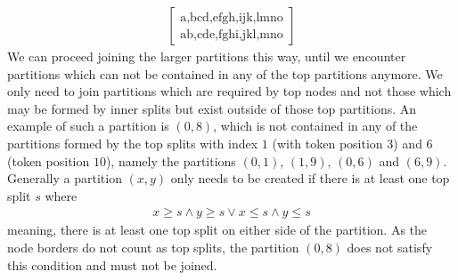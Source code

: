 {
\ttfamily
\begin{align*}
    \begin{bmatrix}
        \text{a,bcd,efgh,ijk,lmno}\\
        \text{ab,cde,fghi,jkl,mno}
    \end{bmatrix}
\end{align*}
}
We can proceed joining the larger partitions this way, until we encounter partitions which can not be contained in any of the top partitions anymore. We only need to join partitions which are required by top nodes and not those which may be formed by inner splits but exist outside of those top partitions. An example of such a partition is $(0,8)$, which is not contained in any of the partitions formed by the top splits with index $1$ (with token position $3$) and $6$ (token position $10$), namely the partitions $(0,1)$, $(1, 9)$, $(0, 6)$ and $(6,9)$. Generally a partition $(x, y)$ only needs to be created if there is at least one top split $s$ where
\begin{align*}
x \geq s \land y \geq s \lor x \leq s \land y \leq s
\end{align*}
meaning, there is at least one top split on either side of the partition. As the node borders do not count as top splits, the partition $(0, 8)$ does not satisfy this condition and must not be joined.

